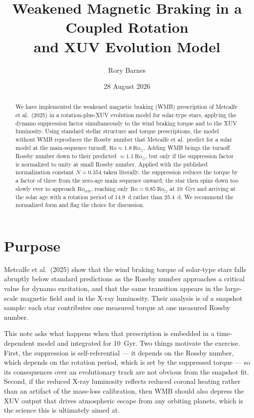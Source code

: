 \documentclass[11pt]{article}
\title{Weakened Magnetic Braking in a Coupled Rotation \\ and XUV Evolution Model}
\author{Rory Barnes}
\date{28 August 2026}
\newcommand{\Rocrit}{\mathrm{Ro_{crit}}}
\newcommand{\Rosun}{\mathrm{Ro_\odot}}
\begin{document}
\maketitle

\begin{abstract}
\noindent
We have implemented the weakened magnetic braking (WMB) prescription of
Metcalfe et al.\ (2025) in a rotation-plus-XUV evolution model for
solar-type stars, applying the dynamo suppression factor simultaneously to
the wind braking torque and to the XUV luminosity. Using standard stellar
structure and torque prescriptions, the model without WMB reproduces the
Rossby number that Metcalfe et al.\ predict for a solar model at the
main-sequence turnoff, $\mathrm{Ro} \approx 1.8~\Rosun$. Adding WMB brings the
turnoff Rossby number down to their predicted $\approx 1.1~\Rosun$, but only if
the suppression factor is normalized to unity at small Rossby number. Applied
with the published normalization constant $N = 0.354$ taken literally, the
suppression reduces the torque by a factor of three from the zero-age main
sequence onward; the star then spins down too slowly ever to approach
$\Rocrit$, reaching only $\mathrm{Ro} = 0.85~\Rosun$ at 10~Gyr and arriving at
the solar age with a rotation period of 14.9~d rather than 25.4~d. We
recommend the normalized form and flag the choice for discussion.
\end{abstract}

\section{Purpose}

Metcalfe et al.\ (2025) show that the wind braking torque of solar-type stars
falls abruptly below standard predictions as the Rossby number approaches a
critical value for dynamo excitation, and that the same transition appears in
the large-scale magnetic field and in the X-ray luminosity. Their analysis is
of a snapshot sample: each star contributes one measured torque at one measured
Rossby number.

This note asks what happens when that prescription is embedded in a
time-dependent model and integrated for 10~Gyr. Two things motivate the
exercise. First, the suppression is self-referential --- it depends on the
Rossby number, which depends on the rotation period, which is set by the
suppressed torque --- so its consequences over an evolutionary track are not
obvious from the snapshot fit. Second, if the reduced X-ray luminosity reflects
reduced coronal heating rather than an artifact of the mass-loss calibration,
then WMB should also depress the XUV output that drives atmospheric escape from
any orbiting planets, which is the science this is ultimately aimed at.
\end{document}
